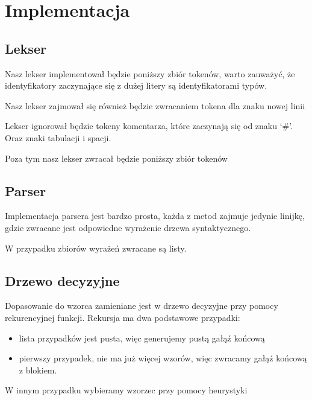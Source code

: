 \documentclass[a4paper,12pt]{book} %
\begin{document}
\chapter{Implementacja}
\section{Lekser}
Nasz lekser implementował będzie poniższy zbiór tokenów, warto zauważyć, że identyfikatory zaczynające się z dużej litery są identyfikatorami typów.

\newpage
Nasz lekser zajmował się również będzie zwracaniem tokena dla znaku nowej linii


Lekser ignorował będzie tokeny komentarza, które zaczynają się od znaku `\#'. Oraz znaki tabulacji i spacji.


Poza tym nasz lekser zwracał będzie poniższy zbiór tokenów

\newpage
\section{Parser}
Implementacja parsera jest bardzo prosta, każda z metod zajmuje jedynie linijkę, gdzie zwracane jest odpowiedne wyrażenie drzewa syntaktycznego.


W przypadku zbiorów wyrażeń zwracane są listy.


\section{Drzewo decyzyjne}



Dopasowanie do wzorca zamieniane jest w drzewo decyzyjne przy pomocy rekurencyjnej funkcji.
Rekursja ma dwa podstawowe przypadki:
\begin{itemize}
  \item lista przypadków jest pusta, więc generujemy pustą gałąź końcową\newpage
  \item pierwszy przypadek, nie ma już więcej wzorów, więc zwracamy gałąź końcową z blokiem.
\end{itemize}

W innym przypadku wybieramy wzorzec przy pomocy heurystyki

\end{document}
